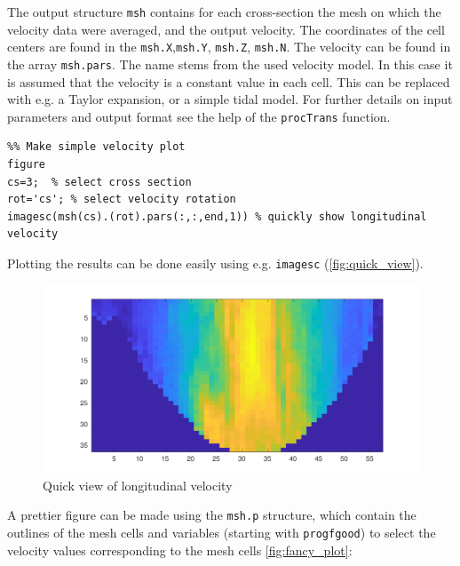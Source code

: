 \documentclass{book}
\newcommand{\ml}[1]{\lstinline{#1}}
\begin{document}
The output structure \ml{msh} contains for each cross-section the mesh on which the velocity data were averaged, and the output velocity. The coordinates of the cell centers are found in the \ml{msh.X},\ml{msh.Y}, \ml{msh.Z}, \ml{msh.N}. The velocity can be found in the array \ml{msh.pars}. The name stems from the used velocity model. In this case it is assumed that the velocity is a constant value in each cell. This can be replaced with e.g. a Taylor expansion, or a simple tidal model. For further details on input parameters and output format see the help of the \ml{procTrans} function.
\begin{lstlisting}
%% Make simple velocity plot
figure
cs=3;  % select cross section
rot='cs'; % select velocity rotation
imagesc(msh(cs).(rot).pars(:,:,end,1)) % quickly show longitudinal velocity
\end{lstlisting}
Plotting the results can be done easily using e.g. \ml{imagesc} (\autoref{fig:quick_view}).
\begin{figure}[p]
  \centering
  \includegraphics[width=\linewidth]{figures/simple_plot.pdf}
  \caption{Quick view of longitudinal velocity}
  \label{fig:quick_view}
\end{figure}
A prettier figure can be made using the \ml{msh.p} structure, which contain the outlines of the mesh cells and variables (starting with \ml{progfgood}) to select the velocity values corresponding to the mesh cells \autoref{fig:fancy_plot}:
\end{document}
